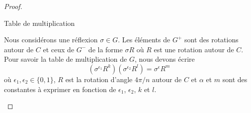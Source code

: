 \begin{proof}
\begin{subproof}
\begin{subproof}
            \item[Table de multiplication]
                
                Nous considérons une réflexion \( \sigma\in G\). Les éléments de \( G^+ \) sont des rotations autour de \( C\) et ceux de \( G^-\) de la forme \( \sigma R\) où \( R\) est une rotation autour de \( C\). Pour savoir la table de multiplication de \( G\), nous devons écrire
                \begin{equation}
                    (\sigma^{\epsilon_1}R^k)(\sigma^{\epsilon_2}R^l)=\sigma^{\epsilon}R^m
                \end{equation}
                où \( \epsilon_1,\epsilon_2\in \{ 0,1 \}\), \( R\) est la rotation d'angle \( 4\pi/n\) autour de \( C\) et \( \alpha\) et \( m\) sont des constantes à exprimer en fonction de \( \epsilon_1\), \( \epsilon_2\), \( k\) et \( l\).


\end{subproof}
\end{subproof}
\end{proof}
